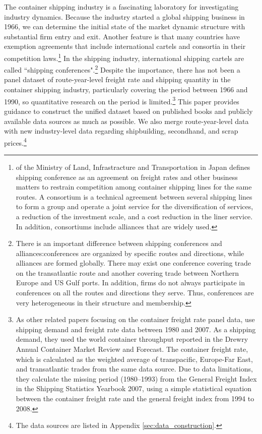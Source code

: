 \documentclass[11pt]{article}
\begin{document}
The container shipping industry is a fascinating laboratory for investigating industry dynamics. Because the industry started a global shipping business in 1966, we can determine the initial state of the market dynamic structure with substantial firm entry and exit. Another feature is that many countries have exemption agreements that include international cartels and consortia in their competition laws.\footnote{\cite{Anteitekina_kokusaikaijouyusoukakuhonotameno_kaijiseisakuno_arikatanitsuite2007} of the Ministry of Land, Infrastracture and Transportation in Japan defines shipping conference as an agreement on freight rates and other business matters to restrain competition among container shipping lines for the same routes. A consortium is a technical agreement between several shipping lines to form a group and operate a joint service for the diversification of services, a reduction of the investment scale, and a cost reduction in the liner service. In addition, consortiums include alliances that are widely used. } In the shipping industry, international shipping cartels are called ``shipping conferences".\footnote{There is an important difference between shipping conferences and alliances:conferences are organized by specific routes and directions, while alliances are formed globally. There may exist one conference covering trade on the transatlantic route and another covering trade between Northern Europe and US Gulf ports. In addition, firms do not always participate in conferences on all the routes and directions they serve. Thus, conferences are very heterogeneous in their structure and membership.} Despite the importance, there has not been a panel dataset of route-year-level freight rate and shipping quantity in the container shipping industry, particularly covering the period between 1966 and 1990, so quantitative research on the period is limited.\footnote{As other related papers focusing on the container freight rate panel data, \cite{luo2009econometric} use shipping demand and freight rate data between 1980 and 2007. As a shipping demand, they used the world container throughput reported in the Drewry Annual Container Market Review and Forecast. The container freight rate, which is calculated as the weighted average of transpacific, Europe-Far East, and transatlantic trades from the same data source. Due to data limitations, they calculate the missing period (1980–1993) from the General Freight Index in the Shipping Statistics Yearbook 2007, using a simple statistical equation between the container freight rate and the general freight index from 1994 to 2008.} This paper provides guidance to construct the unified dataset based on published books and publicly available data sources as much as possible. We also merge route-year-level data with new industry-level data regarding shipbuilding, secondhand, and scrap prices.\footnote{The data sources are listed in Appendix \ref{sec:data_construction}.} 
\end{document}
